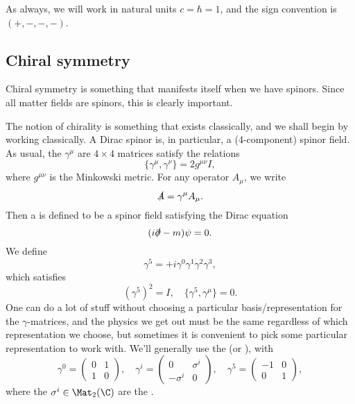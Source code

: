 \documentclass[a4paper]{article}
\begin{document}
As always, we will work in natural units $c = \hbar = 1$, and the sign convention is $(+,-,-,-)$.

\subsection{Chiral symmetry}
Chiral symmetry is something that manifests itself when we have spinors. Since all matter fields are spinors, this is clearly important.

The notion of chirality is something that exists classically, and we shall begin by working classically. A Dirac spinor is, in particular, a (4-component) spinor field. As usual, the \index{$\gamma^\mu$} $\gamma^\mu$ are $4 \times 4$ matrices satisfy the  relations
\[
  \{\gamma^\mu, \gamma^\nu\} = 2 g^{\mu\nu} I,
\]
where $g^{\mu\nu}$ is the Minkowski metric. For any operator $A_\mu$, we write
\[
  \slashed A = \gamma^\mu A_\mu.
\]
Then a  is defined to be a spinor field satisfying the Dirac equation
\[
  (i \slashed{\partial} - m) \psi = 0.
\]
We define
\[
  \gamma^5 = +i \gamma^0 \gamma^1 \gamma^2 \gamma^3,
\]
which satisfies
\[
  (\gamma^5)^2 = I,\quad \{\gamma^5, \gamma^\mu\} = 0.
\]
One can do a lot of stuff without choosing a particular basis/representation for the $\gamma$-matrices, and the physics we get out must be the same regardless of which representation we choose, but sometimes it is convenient to pick some particular representation to work with. We'll generally use the  (or ), with
\[
  \gamma^0 =
  \begin{pmatrix}
    0 & 1 \\
    1 & 0
  \end{pmatrix}, \quad
  \gamma^i =
  \begin{pmatrix}
    0 & \sigma^i\\
    -\sigma^i & 0
  \end{pmatrix},\quad
  \gamma^5 =
  \begin{pmatrix}
    -1 & 0\\
    0 & 1
  \end{pmatrix},
\]
where the $\sigma^i \in \Mat_2(\C)$ are the .
\end{document}
